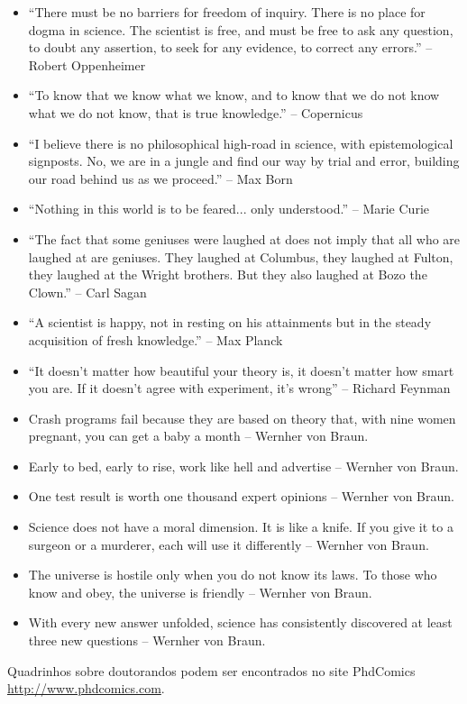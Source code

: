 \begin{itemize}
\item ``There must be no barriers for freedom of inquiry. There is no place for dogma in science. The scientist is free, and must be free to ask any question, to doubt any assertion, to seek for any evidence, to correct any errors.'' -- Robert Oppenheimer
\item ``To know that we know what we know, and to know that we do not know what we do not know, that is true knowledge.'' -- Copernicus
\item ``I believe there is no philosophical high-road in science, with epistemological signposts. No, we are in a jungle and find our way by trial and error, building our road behind us as we proceed.'' -- Max Born
\item ``Nothing in this world is to be feared... only understood.'' -- Marie Curie
\item ``The fact that some geniuses were laughed at does not imply that all who are laughed at are geniuses. They laughed at Columbus, they laughed at Fulton, they laughed at the Wright brothers. But they also laughed at Bozo the Clown.'' -- Carl Sagan
\item	“A scientist is happy, not in resting on his attainments but in the steady acquisition of fresh knowledge.'' -- Max Planck
\item ``It doesn't matter how beautiful your theory is, it doesn't matter how smart you are. If it doesn't agree with experiment, it's wrong'' -- Richard Feynman
\item	Crash programs fail because they are based on theory that, with nine women pregnant, you can get a baby a month -- Wernher von Braun.
\item	Early to bed, early to rise, work like hell and advertise -- Wernher von Braun.
\item	One test result is worth one thousand expert opinions -- Wernher von Braun.
\item	Science does not have a moral dimension. It is like a knife. If you give it to a surgeon or a murderer, each will use it differently -- Wernher von Braun.
\item	The universe is hostile only when you do not know its laws. To those who know and obey, the universe is friendly -- Wernher von Braun.
\item	With every new answer unfolded, science has consistently discovered at least three new questions -- Wernher von Braun.
\end{itemize}


Quadrinhos sobre doutorandos podem ser encontrados no site PhdComics 	\url{http://www.phdcomics.com}.

